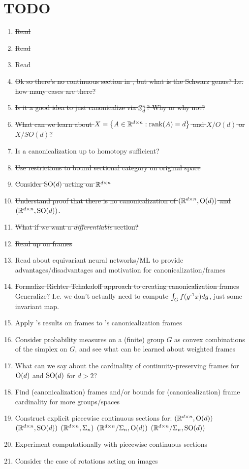 \section{TODO}
\begin{enumerate}
    \item \sout{Read \cite{farber2006topology}}
    \item \sout{Read \cite{colman2013equivariant}}
    \item Read \cite{dym2024equivariant}
    \item \sout{Ok so there's no continuous section in \cite{dym2024equivariant}, but what is the Schwarz genus? I.e. how many cases are there?}
    \item \sout{Is it a good idea to just canonicalize via $\S^n_d$? Why or why not?}
    \item \sout{What can we learn about $X = \set{A \in \R^{d \times n} : \rank(A) = d}$ and $X/O(d)$ or $X/SO(d)$?}
    \item Is a canonicalization up to homotopy sufficient?
    \item \sout{Use restrictions to bound sectional category on original space}
    \item \sout{Consider $\SO(d)$ acting on $\R^{d \times n}$}
    \item \sout{Understand proof that there is no canonicalization of $(\R^{d \times n}, \O(d))$ and $(\R^{d \times n}, \SO(d))$}.
    \item \sout{What if we want a \emph{differentiable} section?}
    \item \sout{Read up on frames}
    \item Read about equivariant neural networks/ML to provide advantages/disadvantages and motivation for canonicalization/frames
    \item \sout{Formalize Richter-Tchakaloff approach to creating canonicalization frames}
        \subitem Generalize? I.e. we don't actually need to compute $\int_G f(\inv{g}x)dg$, just some invariant map.
    \item Apply \cite{dym2024equivariant}'s results on frames to \cite{ma2024canonicalizationperspectiveinvariantequivariant}'s canonicalization frames
    \item Consider probability measures on a (finite) group $G$ as convex combinations of the simplex on $G$, and see what can be learned about weighted frames
    \item What can we say about the cardinality of continuity-preserving frames for $\O(d)$ and $\SO(d)$ for $d > 2$?
    \item Find (canonicalization) frames and/or bounds for (canonicalization) frame cardinality for more groups/spaces
    \item Construct explicit piecewise continuous sections for:
        \subitem $(\R^{d \times n},\O(d))$
        \subitem $(\R^{d \times n},\SO(d))$
        \subitem $(\R^{d \times n},\Sigma_n)$
        \subitem $(\R^{d \times n}/\Sigma_n,\O(d))$
        \subitem $(\R^{d \times n}/\Sigma_n,\SO(d))$
    \item Experiment computationally with piecewise continuous sections
    \item Consider the case of rotations acting on images
\end{enumerate}
